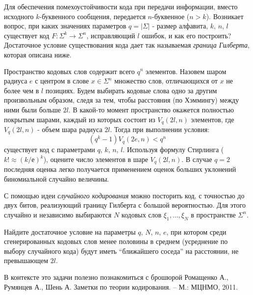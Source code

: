 \begin{problem}
Для обеспечения помехоустойчивости кода при передачи информации, вместо исходного $k$-буквенного сообщения, передается $n$-буквенное ($n>k$). Возникает вопрос, при каких значениях параметров $q = |\Sigma|$ - размер алфавита, $k$, $n$, $l$ существует код $F: \Sigma^k \rightarrow \Sigma^n$, исправляющий  $l$ ошибок, и как его построить? 
Достаточное условие существования кода дает так называемая \textit{граница Гилберта}, которая описана ниже. 

Пространство кодовых слов содержит всего $q^n$ элементов. 
Назовем шаром радиуса $e$ с центром в слове $x\in \Sigma^n$ множество слов, отличающихся от $x$ не более чем в $l$ позициях.
Будем выбирать кодовые слова одно за другим произвольным образом, следя за тем, чтобы расстояния (по Хэммингу) между ними были больше $2l$. В какой-то момент пространство окажется полностью покрытым шарами, каждый из которых состоит из $V_q(2l, n)$ элементов, где $V_q(2l, n)$ - объем шара радиуса $2l$. Тогда при выполнении условия:
\[
(q^k - 1) V_q(2e, n) < q^n
\] 
существует код с параметрами  $q$, $k$, $n$, $l$.
Используя формулу Стирлинга ($k! \approx (k/е)^k$), оцените число элементов в шаре $V_q(2l, n)$. В случае $q=2$ последняя оценка легко получается применением оценок больших уклонений биномиальной случайно величины.

С помощью идеи {\it случайного кодирования} можно посторить код, с точностью до двух битов, реализующий границу Гилберта с большой вероятностью. Для этого случайно и независимо выбираются $N$ кодовых слов $\xi_1, \ldots, \xi_N$ в пространстве $\Sigma^n$. 

Найдите достаточное условие на параметры  $q$, $N$, $n$, $e$, при котором среди сгенерированных кодовых слов менее половины в среднем (усреднение по выбору случайного кода) будут иметь ``ближайшего соседа''  на расстоянии, не превышающем  $2l$.

\begin{remark}
В контексте это задачи полезно познакомиться с брошюрой Ромащенко А., Румянцев А., Шень А. Заметки по теории кодирования. -- М.: МЦНМО, 2011.
\end{remark}

\end{problem} 


